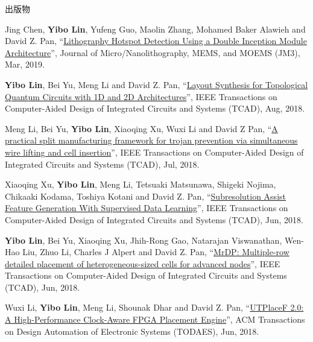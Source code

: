 \begin{rSection}{出版物}
\begin{description}[font=\normalfont, rightmargin=2em]
{}
            

\item[{[J13]}]{
        Jing Chen, \textbf{Yibo Lin}, Yufeng Guo, Maolin Zhang, Mohamed Baker Alawieh and David Z. Pan, 
    ``\href{https://doi.org/10.1117/1.JMM.18.1.013507}{Lithography Hotspot Detection Using a Double Inception Module Architecture}'', 
    Journal of Micro/Nanolithography, MEMS, and MOEMS (JM3), Mar, 2019.
    
}
            

\item[{[J12]}]{
        \textbf{Yibo Lin}, Bei Yu, Meng Li and David Z. Pan, 
    ``\href{https://doi.org/10.1109/TCAD.2017.2760511}{Layout Synthesis for Topological Quantum Circuits with 1D and 2D Architectures}'', 
    IEEE Transactions on Computer-Aided Design of Integrated Circuits and Systems (TCAD), Aug, 2018.
    
}
            

\item[{[J11]}]{
        Meng Li, Bei Yu, \textbf{Yibo Lin}, Xiaoqing Xu, Wuxi Li and David Z Pan, 
    ``\href{https://doi.org/10.1109/TCAD.2018.2859402}{A practical split manufacturing framework for trojan prevention via simultaneous wire lifting and cell insertion}'', 
    IEEE Transactions on Computer-Aided Design of Integrated Circuits and Systems (TCAD), Jul, 2018.
    
}
            

\item[{[J10]}]{
        Xiaoqing Xu, \textbf{Yibo Lin}, Meng Li, Tetsuaki Matsunawa, Shigeki Nojima, Chikaaki Kodama, Toshiya Kotani and David Z. Pan, 
    ``\href{https://doi.org/10.1109/TCAD.2017.2748029}{Subresolution Assist Feature Generation With Supervised Data Learning}'', 
    IEEE Transactions on Computer-Aided Design of Integrated Circuits and Systems (TCAD), Jun, 2018.
    
}
            

\item[{[J9]}]{
        \textbf{Yibo Lin}, Bei Yu, Xiaoqing Xu, Jhih-Rong Gao, Natarajan Viswanathan, Wen-Hao Liu, Zhuo Li, Charles J Alpert and David Z. Pan, 
    ``\href{https://doi.org/10.1109/TCAD.2017.2748025}{MrDP: Multiple-row detailed placement of heterogeneous-sized cells for advanced nodes}'', 
    IEEE Transactions on Computer-Aided Design of Integrated Circuits and Systems (TCAD), Jun, 2018.
    
}
            

\item[{[J8]}]{
        Wuxi Li, \textbf{Yibo Lin}, Meng Li, Shounak Dhar and David Z. Pan, 
    ``\href{https://doi.org/10.1145/3174849}{UTPlaceF 2.0: A High-Performance Clock-Aware FPGA Placement Engine}'', 
    ACM Transactions on Design Automation of Electronic Systems (TODAES), Jun, 2018.
    
}
\end{description}
\end{rSection}
